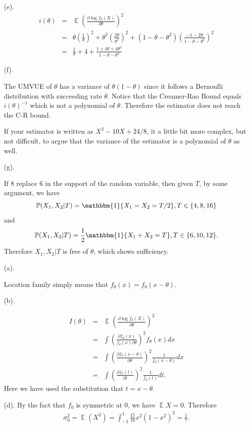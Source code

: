\documentclass[12pt]{article}
\newenvironment{problem}[2][Problem]{\begin{trivlist}
\item[\hskip \labelsep {\bfseries #1}\hskip \labelsep {\bfseries #2.}]}{\end{trivlist}}
\newcommand{\E}{\operatorname{\mathbb{E}}}
\renewcommand{\P}{\operatorname{\mathbb{P}}}
\newcommand{\1}{\mathbbm{1}}
\begin{document}
(e).
\begin{eqnarray*} 
i(\theta) &=& \E(\frac{\partial \log f_\theta(X)}{\partial \theta})^2 \\
& =& \theta (\frac{1}{\theta})^2 + \theta^2 (\frac{2\theta}{\theta^2})^2 + (1-\theta -\theta^2 )(\frac{-1-2\theta}{1-\theta-\theta^2})^2\\
& = & \frac{1}{\theta} +4 + \frac{1+4\theta +4\theta^2}{1-\theta - \theta^2} 
\end{eqnarray*}


(f).

The UMVUE of $\theta$ has a variance of $\theta(1-\theta)$ since it follows a Bernoulli distribution with succeeding rate $\theta$. Notice that the Creamer-Rao Bound equals $i(\theta)^{-1}$ which is not a polynomial of $\theta$. Therefore the estimator does not reach the C-R bound.

If your estimator is written as $X^2 - 10X +24 /8$, it a little bit more complex, but not difficult, to argue that the variance of the estimator is a polynomial of $\theta$ as well.

(g).

If $8$ replace $6$ in the support of the random variable, then given $T$, by some argument, we have
$$
\P(X_1, X_2|T) = \1\{X_1 = X_2 = T/2 \} , T \in \{4,8,16\}
$$
and
$$
\P(X_1, X_2|T) =\frac{1}{2} \1 \{X_1 +X_2 =T\} , T \in \{6,10,12\}.
$$
Therefore $X_1, X_2|T$ is free of $\theta$, which shows sufficiency.


\begin{problem}{2}
\end{problem}

(a). 

Location family simply means that $f_\theta(x) = f_0(x-\theta)$.

(b).

\begin{eqnarray*}
I(\theta) &=& \E(\frac{\partial \log f_\theta(X)}{\partial \theta})^2 \\
&=& \int (\frac{\partial f_\theta(x)}{f_\theta(x) \partial \theta})^2 f_\theta(x) dx\\
&=& \int (\frac{\partial f_0(x - \theta)}{\partial \theta})^2 \frac{1}{f_0(x - \theta)}  dx\\
&=& \int (\frac{\partial f_0(t)}{\partial t})^2 \frac{1}{f_0(t)}  dt.
\end{eqnarray*}
Here we have used the substitution that $t = x - \theta$.

(d).
By the fact that $f_0$ is symmetric at $0$, we have $\E X =0$. Therefore
\begin{eqnarray*}
\sigma_0^2  =  \E (X^2) =\int_{-1}^1 \frac{15}{16} x^2 (1-x^2)^2 = \frac{1}{7}.
\end{eqnarray*}
\end{document}
